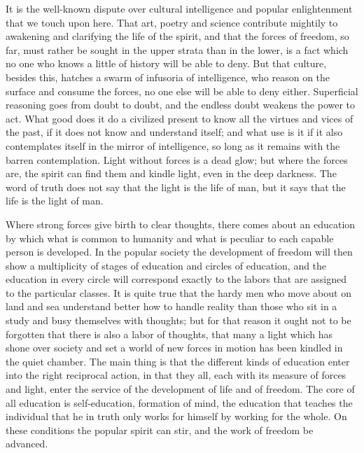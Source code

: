 \documentclass[12pt,a4paper,openany]{book}
\newcommand{\opage}[1]{\marginnote{\footnotesize\textit{[#1]}}}
\begin{document}
It is the well-known dispute over cultural intelligence
and popular enlightenment that we touch upon here. That art, poetry and
science contribute mightily to awakening and clarifying the life of the spirit,
and that the forces of freedom, so far, must rather be
sought in the upper strata than in the lower, is a fact
which no one who knows a little of history will be able
to deny. But that culture, besides this, hatches
a swarm of infusoria of intelligence, who reason
on the surface and consume the forces, no one else will be able
to deny either. Superficial reasoning goes from doubt
to doubt, and the endless doubt weakens the power to act.
What good does it do a civilized present to know all
the virtues and vices of the past, if it does not know
and understand itself; and what use is it if it
also contemplates itself in the mirror of intelligence, so long as it
remains with the barren contemplation. Light without forces
is a dead glow; but where the forces are, the spirit can
find them and kindle light, even in the deep darkness.
\setcounter{footnote}{0}%
\opage{61}The word of truth does not say that the light is the life of man,
but it says that the life is the light of man.

Where strong forces give birth to clear thoughts, there comes about
an education by which what is common to humanity
and what is peculiar to each capable person
is developed. In the popular society the development of freedom
will then show a multiplicity of stages of education and circles of education,
and the education in every circle will correspond exactly
to the labors that are assigned to the particular classes.
It is quite true that the hardy men who move about
on land and sea understand better how to handle
reality than those who sit in a study
and busy themselves with thoughts; but for that reason it ought not
to be forgotten that there is also a labor of thoughts, that
many a light which has shone over society and set
a world of new forces in motion has been kindled in
the quiet chamber. The main thing is that the different
kinds of education enter into the right reciprocal action,
in that they all, each with its measure of forces and light,
enter the service of the development of life and of freedom. The core
of all education is self-education, formation of mind, the education
that teaches the individual that he in truth only
works for himself by working for the whole. On
these conditions the popular spirit can stir, and the work of freedom
be advanced.
\end{document}
